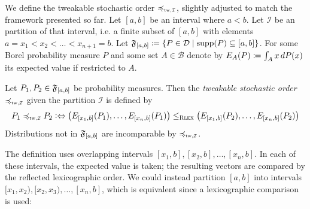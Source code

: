 \documentclass[a4paper]{scrreprt}
\newcommand{\B}{\mathcal{B}}
\begin{document}
    We define the tweakable stochastic order $\leqtw$, slightly adjusted to match the framework presented so far.
    Let $[a, b]$ be an interval where $a < b$. Let $\mathcal{I}$ be an partition of that interval, i.e. a finite subset of $[a, b]$ with elements $a = x_1 < x_2 < \dots < x_{n+1} = b$.
    Let $\mathfrak{F}_{[a, b]} \coloneqq \{P \in \mathcal{D} \mid \operatorname{supp}(P) \subseteq [a, b]\}$.
    For some Borel probability measure $P$ and some set $A \in \B$ denote by $E_A(P) \coloneqq \int_{A} x \, dP(x)$ its expected value if restricted to $A$. 
    \begin{defn}
        \label{def:tweakableStochasticOrder}
        Let $P_1, P_2 \in \mathfrak{F}_{[a, b]}$ be probability measures.
        Then the \emph{tweakable stochastic order} $\leqtw$ given the partition $\mathcal{I}$ is defined by
        \begin{gather*}
            P_1 \leqtw P_2 \colonlra \bigpars{E_{[x_1, b]}(P_{1}), \dots, E_{[x_n, b]}(P_1)} \leqRlex \bigpars{E_{[x_1, b]}(P_2), \dots, E_{[x_n, b]}(P_2)}
        \end{gather*}
        Distributions not in $\mathfrak{F}_{[a, b]}$ are incomparable by $\leqtw$.
    \end{defn}

    The definition uses overlapping intervals $[x_1, b], [x_2, b], \dots, [x_n, b]$. In each of these intervals, the expected value is taken; the resulting vectors are compared by the reflected lexicographic order. We could instead partition $[a, b]$  into intervals $[x_1, x_2), [x_2, x_3), \dots, [x_n, b]$, which is equivalent since a lexicographic comparison is used:
\end{document}
